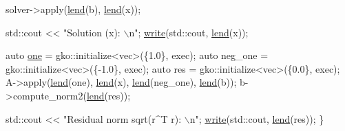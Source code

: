\begin{DoxyCodeInclude}
    solver->apply(\hyperlink{namespacegko_aa8cb4876b72e5e1036ea9575443c439b}{lend}(b), \hyperlink{namespacegko_aa8cb4876b72e5e1036ea9575443c439b}{lend}(x));

    std::cout << \textcolor{stringliteral}{"Solution (x): \(\backslash\)n"};
    \hyperlink{namespacegko_a859dc47a462721d83728d91ab7fa2148}{write}(std::cout, \hyperlink{namespacegko_aa8cb4876b72e5e1036ea9575443c439b}{lend}(x));

    \textcolor{keyword}{auto} \hyperlink{namespacegko_a0059e27f8f4bc348ff65c1e60caf47c8}{one} = gko::initialize<vec>(\{1.0\}, exec);
    \textcolor{keyword}{auto} neg\_one = gko::initialize<vec>(\{-1.0\}, exec);
    \textcolor{keyword}{auto} res = gko::initialize<vec>(\{0.0\}, exec);
    A->apply(\hyperlink{namespacegko_aa8cb4876b72e5e1036ea9575443c439b}{lend}(one), \hyperlink{namespacegko_aa8cb4876b72e5e1036ea9575443c439b}{lend}(x), \hyperlink{namespacegko_aa8cb4876b72e5e1036ea9575443c439b}{lend}(neg\_one), \hyperlink{namespacegko_aa8cb4876b72e5e1036ea9575443c439b}{lend}(b));
    b->compute\_norm2(\hyperlink{namespacegko_aa8cb4876b72e5e1036ea9575443c439b}{lend}(res));

    std::cout << \textcolor{stringliteral}{"Residual norm sqrt(r^T r): \(\backslash\)n"};
    \hyperlink{namespacegko_a859dc47a462721d83728d91ab7fa2148}{write}(std::cout, \hyperlink{namespacegko_aa8cb4876b72e5e1036ea9575443c439b}{lend}(res));
\}
\end{DoxyCodeInclude}
 